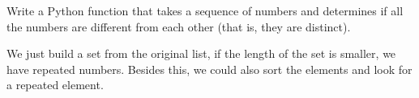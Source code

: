  \label{sssec:ex1_15}

Write a Python function that takes a sequence of numbers and determines if all the numbers are different from each other (that is, they are distinct).

We just build a set from the original list, if the length of the set is smaller, we have repeated numbers. Besides this, we could also sort the elements and look for a repeated element. 



